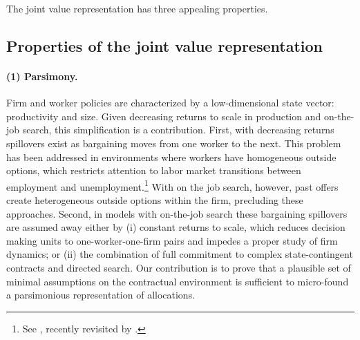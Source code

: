 The joint value representation has three appealing properties.

\subsection{Properties of the joint value representation}

\vspace*{-.1cm}
\paragraph{(1) Parsimony.}
Firm and worker policies are characterized by a low-dimensional state vector: productivity and size.
Given decreasing returns to scale in production and on-the-job search, this simplification is a contribution.
First, with decreasing returns spillovers exist as bargaining moves from one worker to the next.
This problem has been addressed in environments where workers have homogeneous outside options, which restricts attention to labor market transitions between employment and unemployment.\footnote{See \citet{StoleZwiebelRESTUD}, recently revisited by \citet{brugemann2018intra}.}
With on the job search, however, past offers create heterogeneous outside options within the firm, precluding these approaches.
Second, in models with on-the-job search these bargaining spillovers are assumed away either by (i) constant returns to scale, which reduces decision making units to one-worker-one-firm pairs and impedes a proper study of firm dynamics; or (ii) the combination of full commitment to complex state-contingent contracts and directed search.
Our contribution is to prove that a plausible set of minimal assumptions on the contractual environment is sufficient to micro-found a parsimonious representation of allocations.

\vspace*{-.3cm}
